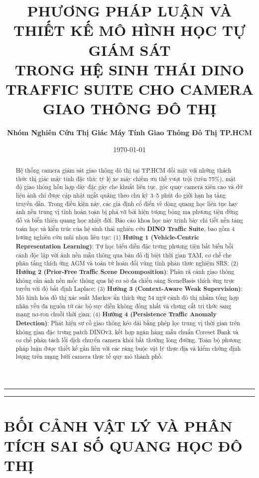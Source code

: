\documentclass[11pt,a4paper]{article}
\title{\textbf{\Large PHƯƠNG PHÁP LUẬN VÀ THIẾT KẾ MÔ HÌNH HỌC TỰ GIÁM SÁT\\TRONG HỆ SINH THÁI DINO TRAFFIC SUITE CHO CAMERA GIAO THÔNG ĐÔ THỊ}}
\author{\textbf{Nhóm Nghiên Cứu Thị Giác Máy Tính Giao Thông Đô Thị TP.HCM}}
\date{\today}
\begin{document}
\maketitle

\begin{abstract}
Hệ thống camera giám sát giao thông đô thị tại TP.HCM đối mặt với những thách thức thị giác máy tính đặc thù: tỷ lệ xe máy chiếm ưu thế vượt trội (trên 75\%), mật độ giao thông hỗn hợp dày đặc gây che khuất liên tục, góc quay camera xiên cao và dữ liệu ảnh chỉ được cập nhật ngắt quãng theo chu kỳ 3--5 phút do giới hạn hạ tầng truyền dẫn. Trong điều kiện này, các giả định cổ điển về dòng quang học liên tục hay ảnh nền trung vị tĩnh hoàn toàn bị phá vỡ bởi hiện tượng bóng ma phương tiện dừng đỗ và biến thiên quang học nhiệt đới. Báo cáo khoa học này trình bày chi tiết nền tảng toán học và kiến trúc của hệ sinh thái nghiên cứu \textbf{DINO Traffic Suite}, bao gồm 4 hướng nghiên cứu mũi nhọn liên tục: (1) \textbf{Hướng 1 (Vehicle-Centric Representation Learning)}: Tự học biểu diễn đặc trưng phương tiện bất biến bối cảnh độc lập với ảnh nền mẫu thông qua bản đồ dị biệt thời gian TAM, cơ chế che phân tầng thích ứng AGM và toán tử hoán đổi vùng tĩnh phản thực nghiệm SRS; (2) \textbf{Hướng 2 (Prior-Free Traffic Scene Decomposition)}: Phân rã cảnh giao thông không cần ảnh nền mốc thông qua hệ cơ sở đa chiếu sáng SceneBasis thích ứng trực tuyến với độ bất định Laplace; (3) \textbf{Hướng 3 (Context-Aware Weak Supervision)}: Mô hình hóa đồ thị xác suất Markov ẩn thích ứng 54 ngữ cảnh đô thị nhằm tổng hợp nhãn yếu đa nguồn từ các bộ suy diễn không đồng nhất và chưng cất tri thức sang mạng nơ-ron chuỗi thời gian; (4) \textbf{Hướng 4 (Persistence Traffic Anomaly Detection)}: Phát hiện sự cố giao thông kéo dài bằng phép lọc trung vị thời gian trên không gian đặc trưng patch DINOv3, kết hợp ngân hàng mẫu chuẩn Coreset Bank và cơ chế phân tách lỗi dịch chuyển camera khỏi bất thường lòng đường. Toàn bộ phương pháp luận được thiết kế gắn liền với các ràng buộc vật lý thực địa và kiểm chứng định lượng trên mạng lưới camera thực tế quy mô thành phố.
\end{abstract}

\hrule
\vspace{0.8em}
\tableofcontents
\vspace{0.8em}
\hrule
\vspace{1.5em}

\section{BỐI CẢNH VẬT LÝ VÀ PHÂN TÍCH SAI SỐ QUANG HỌC ĐÔ THỊ}
\end{document}
